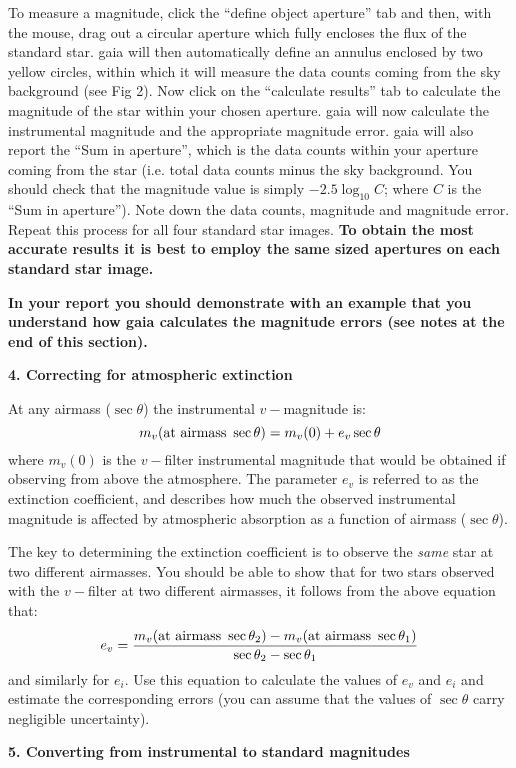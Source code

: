 To measure a magnitude, click the ``define object aperture'' tab and then, with the mouse, drag out a circular aperture which fully encloses the flux of the standard star. {\sc gaia} will then automatically define an annulus enclosed by two yellow circles, within which it will measure the data counts coming from the sky background (see Fig 2). Now click on the ``calculate results'' tab to calculate the magnitude of the star within your chosen aperture. {\sc gaia} will now calculate the instrumental magnitude and the appropriate magnitude error. {\sc gaia} will also report the ``Sum in aperture'', which is the data counts within your aperture coming from the star (i.e. total data counts minus the sky background. You should check that the magnitude value is simply $-2.5\log_{10} C$; where $C$ is the ``Sum in aperture''). Note down the data counts, magnitude and magnitude error. Repeat this process for all four standard star images. {\bf To obtain the most accurate results it is best to employ the same sized apertures on each standard star image.}


\newpage
{\bf In your report you should demonstrate with an example that you understand how {\sc gaia} calculates the magnitude errors (see notes at the end of this section).}



{\large{\bf 4. Correcting for atmospheric extinction}}

At any airmass ($\sec \theta$) the instrumental $v-$magnitude is: \[   m_v({\rm at\ airmass\ }\sec \theta) = m_v(0) + e_v\sec \theta   \] where $m_v(0)$ is the $v-$filter instrumental magnitude that would be obtained if  observing from above the atmosphere. The parameter $e_v$ is referred to as the extinction coefficient, and describes how much the observed instrumental magnitude is affected by atmospheric absorption as a function of airmass ($\sec \theta$).

The key to determining the extinction coefficient is to observe the {\it same} star at two different airmasses. You should be able to show that for two stars observed with the $v-$filter at two different airmasses, it follows from the above equation that: \[   e_v = \frac{m_v({\rm at\ airmass\ }\sec \theta_2)-m_v({\rm at\ airmass\ }\sec \theta_1)}{\sec \theta_2 - \sec \theta_1}   \] and similarly for $e_i$. Use this equation to calculate the values of $e_v$ and $e_i$ and estimate the corresponding errors (you can assume that the values of $\sec \theta$ carry negligible uncertainty).

{\large{\bf 5. Converting from instrumental to standard magnitudes}}

